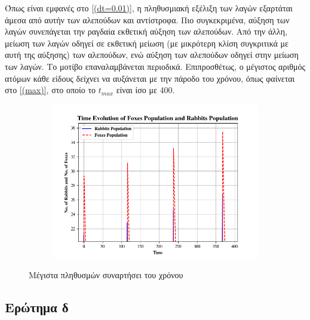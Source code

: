 \documentclass{article}
\begin{document}
\vspace*{\fill}
\newpage
\noindent
Όπως είναι εμφανές στο \autoref{(dt=0.01)}, η πληθυσμιακή εξέλιξη των λαγών εξαρτάται άμεσα από αυτήν των αλεπούδων και αντίστροφα. Πιο συγκεκριμένα, αύξηση των λαγών συνεπάγεται την ραγδαία εκθετική αύξηση των αλεπούδων. Από την άλλη, μείωση των λαγών οδηγεί σε εκθετική μείωση (με μικρότερη κλίση συγκριτικά με αυτή της αύξησης) των αλεπούδων, ενώ αύξηση των αλεπούδων οδηγεί στην μείωση των λαγών. Το μοτίβο επαναλαμβάνεται περιοδικά. Επιπροσθέτως, ο μέγιστος αριθμός ατόμων κάθε είδους δείχνει να αυξάνεται με την πάροδο του χρόνου, όπως φαίνεται στο \autoref{(max)}, στο οποίο το $ t_{max} $ είναι ίσο με 400.

\begin{figure}[H]
    \centering
	\begin{adjustbox}{center}
	
		\begin{subfigure}[c]{0.8\textwidth}    
			\includegraphics[width=\textwidth,height=\textheight,keepaspectratio]{media/2/Figure_1.png}
		\end{subfigure}%

	\end{adjustbox}
\caption{Μέγιστα πληθυσμών συναρτήσει του χρόνου}
\label{(max)}
\end{figure}
\vspace*{\fill}
\subsection{Ερώτημα δ}
\end{document}

